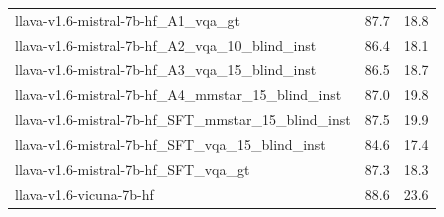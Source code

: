 \begin{tabular}{lrr}
llava-v1.6-mistral-7b-hf_A1_vqa_gt & 87.7 & 18.8 \\
llava-v1.6-mistral-7b-hf_A2_vqa_10_blind_inst & 86.4 & 18.1 \\
llava-v1.6-mistral-7b-hf_A3_vqa_15_blind_inst & 86.5 & 18.7 \\
llava-v1.6-mistral-7b-hf_A4_mmstar_15_blind_inst & 87.0 & 19.8 \\
llava-v1.6-mistral-7b-hf_SFT_mmstar_15_blind_inst & 87.5 & 19.9 \\
llava-v1.6-mistral-7b-hf_SFT_vqa_15_blind_inst & 84.6 & 17.4 \\
llava-v1.6-mistral-7b-hf_SFT_vqa_gt & 87.3 & 18.3 \\
llava-v1.6-vicuna-7b-hf & 88.6 & 23.6 \\
\bottomrule
\end{tabular}
